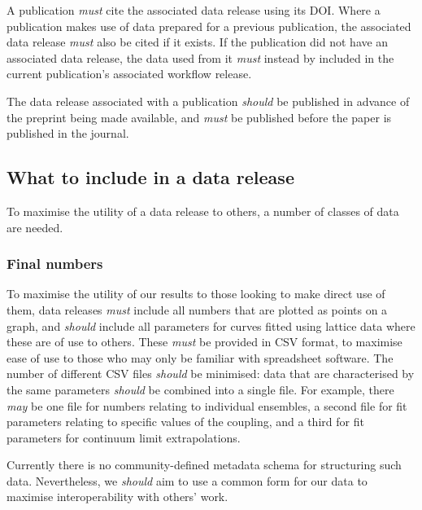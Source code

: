 \documentclass{article}
\newcommand\rfcword[1]{\emph{#1}\xspace}
\newcommand\must{\rfcword{must}}
\newcommand\should{\rfcword{should}}
\newcommand\may{\rfcword{may}}
\begin{document}
A publication \must cite the associated data release using its DOI\@.
Where a publication makes use of data prepared for a previous publication,
the associated data release \must also be cited if it exists.
If the publication did not have an associated data release,
the data used from it \must instead by included in
the current publication's associated workflow release.

The data release associated with a publication
\should be published in advance of the preprint being made available,
and \must be published before the paper is published in the journal.

\subsection{What to include in a data release}

To maximise the utility of a data release to others,
a number of classes of data are needed.

\subsubsection{Final numbers}\label{sec:dr-numbers}

To maximise the utility of our results to those looking to make direct use of them,
data releases \must include all numbers that are plotted as points on a graph,
and \should include all parameters for curves fitted using lattice data
where these are of use to others.
These \must be provided in CSV format,
to maximise ease of use to those who may only be familiar with spreadsheet software.
The number of different CSV files \should be minimised:
data that are characterised by the same parameters
\should be combined into a single file.
For example,
there \may be one file for numbers relating to individual ensembles,
a second file for fit parameters relating to specific values of the coupling,
and a third for fit parameters for continuum limit extrapolations.

Currently there is no community-defined metadata schema for structuring such data.
Nevertheless,
we \should aim to use a common form for our data
to maximise interoperability with others' work.
\end{document}

